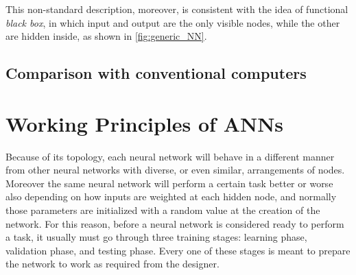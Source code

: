 This non-standard description, moreover, is consistent with the idea of functional \textit{black box}, in which input and output are the only visible nodes, while the other are hidden inside, as shown in \autoref{fig:generic_NN}.

\subsection{Comparison with conventional computers}
\label{ssec:Comparison_with_conventional_computers}


\section{Working Principles of ANNs}
\label{sec:Working_Principles_of_ANNs}
Because of its topology, each neural network will behave in a different manner from other neural networks with diverse, or even similar, arrangements of nodes.
Moreover the same neural network will perform a certain task better or worse also depending on how inputs are weighted at each hidden node, and normally those parameters are initialized with a random value at the creation of the network.
For this reason, before a neural network is considered ready to perform a task, it usually must go through three training stages: learning phase, validation phase, and testing phase.
Every one of these stages is meant to prepare the network to work as required from the designer.

